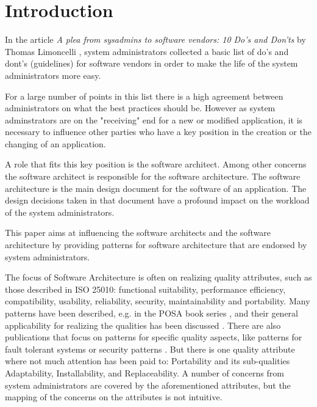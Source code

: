 \section{Introduction} 

In the article \textit{A plea from sysadmins to software vendors: 10 Do's and Don'ts} by Thomas Limoncelli \cite{Limoncelli2011a}, system administrators collected a basic list of do's and dont's (guidelines) for software vendors in order to make the life of the system administrators more easy. 

For a large number of points in this list there is a high agreement between administrators on what the best practices should be. However as system adminstrators are on the "receiving" end for a new or modified application, it is necessary to influence other parties who have a key position in the creation or the changing of an application. 

A role that fits this key position is the software architect. Among other concerns the software architect is responsible for the software architecture. The software architecture is the main design document for the software of an application. The design decisions taken in that document have a profound impact on the workload of the system administrators. 

This paper aims at influencing the software architects and the software architecture by providing patterns for software architecture that are endorsed by system administrators.

The focus of Software Architecture is often on realizing quality attributes, such as those described in ISO 25010: functional suitability, performance efficiency, compatibility, usability, reliability, security, maintainability and portability. Many patterns have been described, e.g. in the POSA book series \cite{Buschmann1996}, and their general applicability for realizing the qualities has been discussed \cite{Harrison2011}. 
There are also publications that focus on patterns for specific quality aspects, like patterns for fault tolerant systems \cite{Hanmer2007} or security patterns \cite{Schumacher2005}.
 But there is one quality attribute where not much attention has been paid to: Portability and its sub-qualities Adaptability, Installability, and Replaceability. A number of concerns from system administrators are covered by the aforementioned attributes, but the mapping of the concerns on the attributes is not intuitive.

